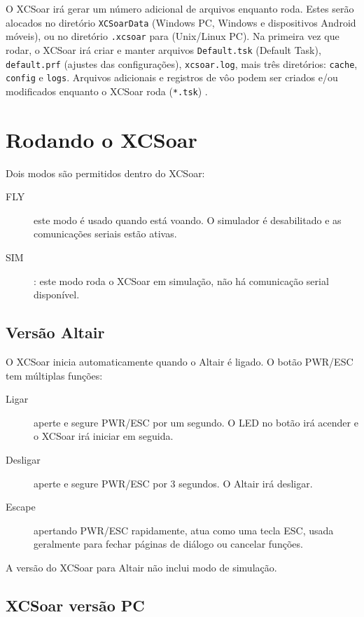 O XCSoar irá gerar um número adicional de arquivos enquanto roda.  Estes serão alocados no diretório  \texttt{XCSoarData} (Windows PC, 
Windows e dispositivos Android móveis), ou no diretório \texttt{.xcsoar} para (Unix/Linux
PC).  Na primeira vez que rodar, o XCSoar irá criar e manter arquivos
\texttt{Default.tsk} (Default Task),  
\texttt{default.prf} 
(ajustes das configurações),
\texttt{xcsoar.log}, 
mais três diretórios: \texttt{cache},
\texttt{config} e \texttt{logs}.  Arquivos adicionais e registros de vôo podem ser criados e/ou modificados enquanto o XCSoar roda (\texttt{*.tsk}) .


\section{Rodando o XCSoar}

Dois modos são permitidos dentro do XCSoar: 
\begin{description}
\item[FLY]este modo é usado quando está voando.  O simulador é desabilitado e as comunicações seriais estão ativas.
\item[SIM] :  este modo roda o XCSoar em simulação, não há comunicação serial disponível.
\end{description}

\subsection*{Versão Altair}
O XCSoar inicia automaticamente quando o Altair é ligado.  O botão PWR/ESC tem múltiplas funções:
\begin{description}
\item[Ligar]  aperte e segure PWR/ESC por um segundo.  O LED no botão irá acender e o XCSoar irá iniciar em seguida.
\item[Desligar] aperte e segure PWR/ESC por 3 segundos.  O Altair irá desligar.
\item[Escape] apertando PWR/ESC rapidamente, atua como uma tecla ESC, usada geralmente para fechar páginas de diálogo ou cancelar funções.

\end{description}

A versão do XCSoar para Altair não inclui modo de simulação.

\subsection*{XCSoar versão PC}

